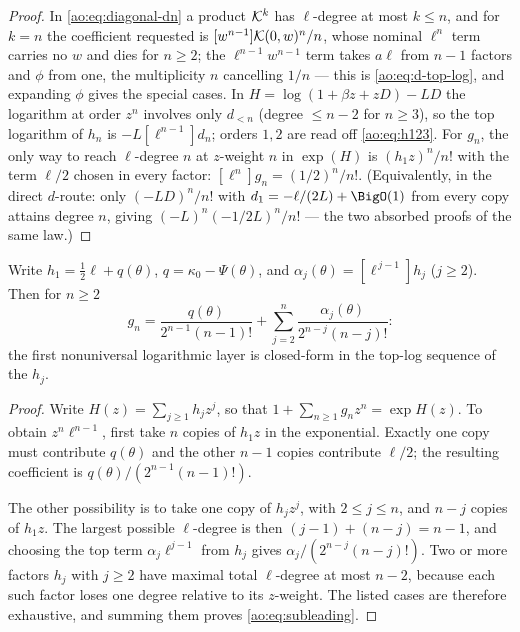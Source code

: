 \begin{proof}
In \eqref{ao:eq:diagonal-dn} a product $\mathcal K^{k}$ has $\ell$-degree at
most $k\le n$, and for $k=n$ the coefficient requested is
$[w^{n-1}]\mathcal K(0,w)^{n}/n$, whose nominal $\ell^{n}$ term carries no
$w$ and dies for $n\ge2$; the $\ell^{n-1}w^{n-1}$ term takes
$a\ell$ from $n-1$ factors and $\phi$ from one, the multiplicity $n$
cancelling $1/n$ --- this is \eqref{ao:eq:d-top-log}, and expanding
$\phi$ gives the special cases.  In $H=\log(1+\beta z+zD)-LD$ the
logarithm at order $z^{n}$ involves only $d_{<n}$ (degree
$\le n-2$ for $n\ge3$), so the top logarithm of $h_n$ is
$-L[\ell^{n-1}]d_n$; orders $1,2$ are read off
\eqref{ao:eq:h123}.  For $g_n$, the only way to reach $\ell$-degree $n$
at $z$-weight $n$ in $\exp(H)$ is $(h_1z)^{n}/n!$ with the term
$\ell/2$ chosen in every factor:
$[\ell^{n}]g_n=(1/2)^{n}/n!$.  (Equivalently, in the direct
$d$-route: only $(-LD)^{n}/n!$ with $d_1=-\ell/(2L)+\BigO(1)$ from
every copy attains degree $n$, giving
$(-L)^{n}(-1/2L)^{n}/n!$ --- the two absorbed proofs of the same
law.)
\end{proof}

\begin{corollary}
\label{ao:cor:subleading}
Write $h_1=\tfrac12\ell+q(\theta)$,
$q=\kappa_0-\Psi(\theta)$, and $\alpha_j(\theta)=[\ell^{\,j-1}]h_j$
($j\ge2$).  Then for $n\ge2$
\begin{equation}
 [\ell^{\,n-1}]\,g_n
 =\frac{q(\theta)}{2^{n-1}(n-1)!}
 +\sum_{j=2}^{n}\frac{\alpha_j(\theta)}{2^{n-j}(n-j)!}:
 \label{ao:eq:subleading}
\end{equation}
the first nonuniversal logarithmic layer is closed-form in the
top-log sequence of the $h_j$.
\end{corollary}

\begin{proof}
Write $H(z)=\sum_{j\ge1}h_jz^j$, so that
$1+\sum_{n\ge1}g_nz^n=\exp H(z)$.  To obtain $z^n\ell^{n-1}$, first
take $n$ copies of $h_1z$ in the exponential.  Exactly one copy must
contribute $q(\theta)$ and the other $n-1$ copies contribute $\ell/2$;
the resulting coefficient is
$q(\theta)/(2^{n-1}(n-1)!)$.

The other possibility is to take one copy of $h_jz^j$, with
$2\le j\le n$, and $n-j$ copies of $h_1z$.  The largest possible
$\ell$-degree is then $(j-1)+(n-j)=n-1$, and choosing the top term
$\alpha_j\ell^{j-1}$ from $h_j$ gives
$\alpha_j/(2^{n-j}(n-j)!)$.  Two or more factors $h_j$ with $j\ge2$
have maximal total $\ell$-degree at most $n-2$, because each such
factor loses one degree relative to its $z$-weight.  The listed cases
are therefore exhaustive, and summing them proves
\eqref{ao:eq:subleading}.
\end{proof}

